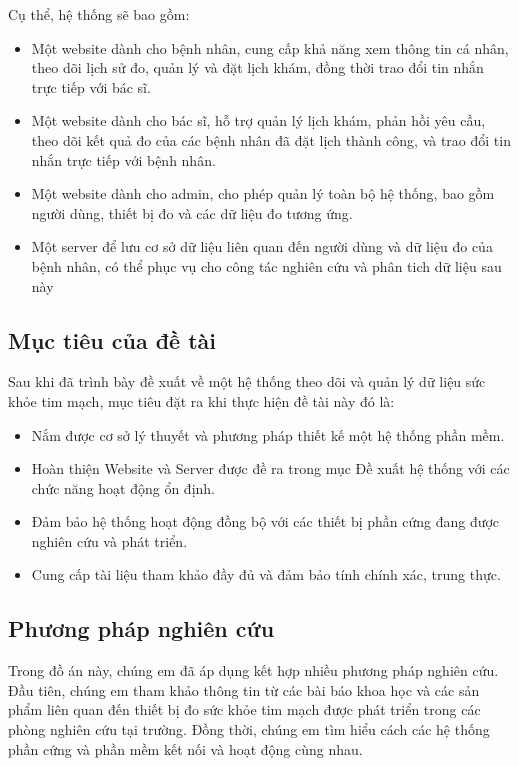 Cụ thể, hệ thống sẽ bao gồm:

\begin{adjustwidth}{1.5em}{}
  \begin{itemize}
     
      \item Một website dành cho bệnh nhân, cung cấp khả năng xem thông tin cá nhân, theo dõi lịch sử đo, quản lý và đặt lịch khám, đồng thời trao đổi tin nhắn trực tiếp với bác sĩ.
      \item Một website dành cho bác sĩ, hỗ trợ quản lý lịch khám, phản hồi yêu cầu, theo dõi kết quả đo của các bệnh nhân đã đặt lịch thành công, và trao đổi tin nhắn trực tiếp với bệnh nhân.
      \item Một website dành cho admin, cho phép quản lý toàn bộ hệ thống, bao gồm người dùng, thiết bị đo và các dữ liệu đo tương ứng.
      \item Một server để lưu cơ sở dữ liệu liên quan đến người dùng và dữ liệu đo của bệnh nhân, có thể phục vụ cho công tác nghiên cứu và phân tich dữ liệu sau này

  \end{itemize}
  \end{adjustwidth}


\subsection*{Mục tiêu của đề tài}
Sau khi đã trình bày đề xuất về một hệ thống theo dõi và quản lý dữ liệu sức khỏe tim mạch, mục tiêu đặt ra khi thực hiện
đề tài này đó là:

\begin{adjustwidth}{1.5em}{}
  \begin{itemize}
      \item Nắm được cơ sở lý thuyết và phương pháp thiết kế một hệ thống phần mềm.
      \item Hoàn thiện Website và Server được đề ra trong mục Đề xuất hệ thống với các chức năng hoạt động ổn định.
      \item Đảm bảo hệ thống hoạt động đồng bộ với các thiết bị phần cứng đang được nghiên cứu và phát triển.
      \item Cung cấp tài liệu tham khảo đầy đủ và đảm bảo tính chính xác, trung thực.

  \end{itemize}
  \end{adjustwidth}

\subsection*{Phương pháp nghiên cứu}
Trong đồ án này, chúng em đã áp dụng kết hợp nhiều phương pháp nghiên cứu. Đầu tiên, chúng em tham khảo thông tin từ các bài báo khoa học và các sản phẩm liên quan đến thiết bị đo sức khỏe tim mạch được phát triển trong các phòng nghiên cứu tại trường.
Đồng thời, chúng em tìm hiểu cách các hệ thống phần cứng và phần mềm kết nối và hoạt động cùng nhau. 

